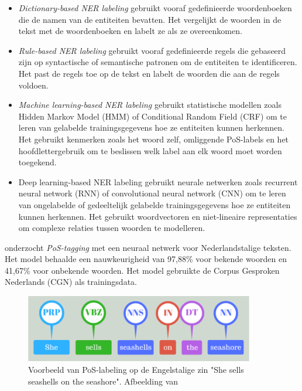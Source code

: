 \begin{itemize}
		\item \textit{Dictionary-based NER labeling} gebruikt vooraf gedefinieerde woordenboeken die de namen van de entiteiten bevatten. Het vergelijkt de woorden in de tekst met de woordenboeken en labelt ze als ze overeenkomen.
		\item \textit{Rule-based NER labeling} gebruikt vooraf gedefinieerde regels die gebaseerd zijn op syntactische of semantische patronen om de entiteiten te identificeren. Het past de regels toe op de tekst en labelt de woorden die aan de regels voldoen.
		\item \textit{Machine learning-based NER labeling} gebruikt statistische modellen zoals Hidden Markov Model (HMM) of Conditional Random Field (CRF) om te leren van gelabelde trainingsgegevens hoe ze entiteiten kunnen herkennen. Het gebruikt kenmerken zoals het woord zelf, omliggende PoS-labels en het hoofdlettergebruik om te beslissen welk label aan elk woord moet worden toegekend.
		\item Deep learning-based NER labeling gebruikt neurale netwerken zoals recurrent neural network (RNN) of convolutional neural network (CNN) om te leren van ongelabelde of gedeeltelijk gelabelde trainingsgegevens hoe ze entiteiten kunnen herkennen. Het gebruikt woordvectoren en niet-lineaire representaties om complexe relaties tussen woorden te modelleren.
\end{itemize}


\textcite{Poel2008} onderzocht \textit{PoS-tagging} met een neuraal netwerk voor Nederlandstalige teksten. Het model behaalde een nauwkeurigheid van 97,88\% voor bekende woorden en 41,67\% voor onbekende woorden. Het model gebruikte de Corpus Gesproken Nederlands (CGN) als trainingsdata.

\begin{figure}[H]
	\begin{center}
		\includegraphics[width=10cm]{img/poslabeling.png}
	\end{center}
	\caption{Voorbeeld van PoS-labeling op de Engelstalige zin "She sells seashells on the seashore". Afbeelding van \textcite{Bilisci2021} }
	\label{fig:pos}
\end{figure}

